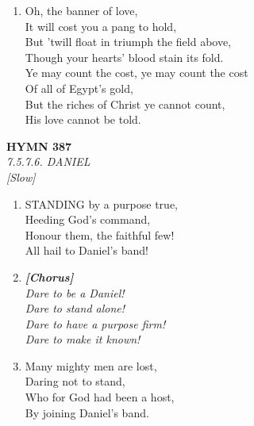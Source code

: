 \begin{enumerate}
    \item Oh, the banner of love, \\
        It will cost you a pang to hold, \\
        But 'twill float in triumph the field above, \\
        Though your hearts' blood stain its fold. \\
        Ye may count the cost, ye may count the cost \\
        Of all of Egypt's gold, \\
        But the riches of Christ ye cannot count, \\
        His love cannot be told.

\end{enumerate}

\newpage
\begin{center}
    {\Large \textbf{HYMN 387}}
    \\
    \textit{7.5.7.6. DANIEL}
    \\
    \textit{\small [Slow]}
\end{center}
\vspace{1em}

\begin{enumerate}
    \item STANDING by a purpose true, \\
        Heeding God's command, \\
        Honour them, the faithful few! \\
        All hail to Daniel's band!

    \item[] \vspace{0.4em}
    \textbf{\textit{[Chorus]}} \\
    \textit{Dare to be a Daniel!} \\
    \textit{Dare to stand alone!} \\
    \textit{Dare to have a purpose firm!} \\
    \textit{Dare to make it known!}
    \vspace{0.4em}

    \item Many mighty men are lost, \\
        Daring not to stand, \\
        Who for God had been a host, \\
        By joining Daniel's band.

\end{enumerate}

